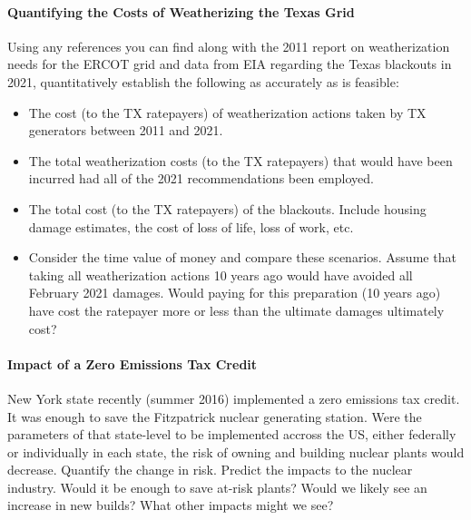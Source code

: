 \documentclass[12pts, answers]{exam}
\begin{document}
\paragraph{Quantifying the Costs of Weatherizing the Texas Grid}
Using any references you can find along with the 2011 report on weatherization needs for the ERCOT grid and data from 
EIA regarding the Texas blackouts in 2021, quantitatively establish the 
following as accurately as is feasible: 
\begin{itemize}
        \item The cost (to the TX ratepayers) of weatherization actions taken by TX generators between 2011 
                and 2021.
        \item The total weatherization costs (to the TX ratepayers) that would have been incurred had all 
                of the 2021 recommendations been employed.
        \item The total cost (to the TX ratepayers) of the blackouts. Include 
                housing damage estimates, the cost of loss of life, loss of 
                work, etc. 
        \item Consider the time value of money and compare these scenarios. 
                Assume that taking all weatherization actions 10 years ago would have 
                avoided all  February 2021 damages. Would paying for this preparation (10 years ago) have 
                cost the ratepayer more or less than the ultimate damages 
                ultimately cost?
\end{itemize}

\paragraph{Impact of a Zero Emissions Tax Credit} New York state recently
(summer 2016) implemented a zero emissions tax credit. It was enough to save
the Fitzpatrick nuclear generating station. Were the parameters of that
state-level to be implemented accross the US, either federally or individually
in each state, the risk of owning and building nuclear plants would decrease.
Quantify the change in risk. Predict the impacts to the nuclear industry. Would
it be enough to save at-risk plants? Would we likely see an increase in new
builds? What other impacts might we see?
\end{document}
